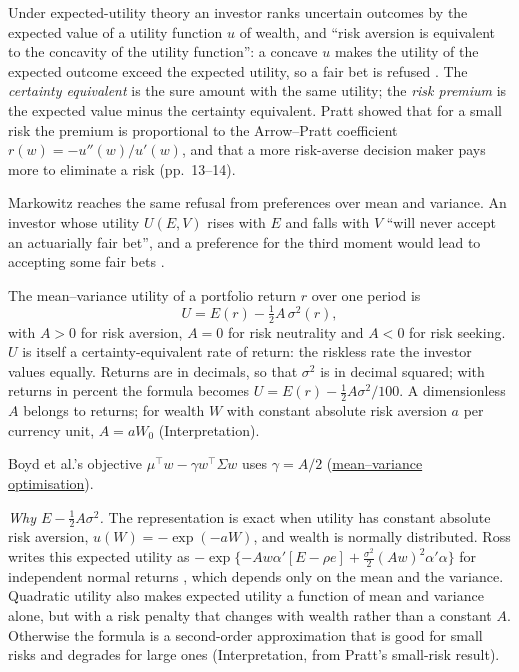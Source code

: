 \begin{qfdefinition}\label{def:risk-aversion-utility}
 Under expected-utility theory an investor ranks uncertain outcomes by the expected value of a utility function $u$ of wealth, and ``risk aversion is equivalent to the concavity of the utility function'': a concave $u$ makes the utility of the expected outcome exceed the expected utility, so a fair bet is refused \citep[IDEI working paper 804, July 2013, p.~3]{risk-choice-review-2013}. The \emph{certainty equivalent} is the sure amount with the same utility; the \emph{risk premium} is the expected value minus the certainty equivalent. Pratt showed that for a small risk the premium is proportional to the Arrow--Pratt coefficient $r(w)=-u''(w)/u'(w)$, and that a more risk-averse decision maker pays more to eliminate a risk (pp.~13--14).

Markowitz reaches the same refusal from preferences over mean and variance. An investor whose utility $U(E,V)$ rises with $E$ and falls with $V$ ``will never accept an actuarially fair bet'', and a preference for the third moment would lead to accepting some fair bets \citep[\emph{Journal of Finance} 7(1), 1952, pp.~90--91]{s6-markowitz}.

 The mean--variance utility of a portfolio return $r$ over one period is
\[ U=E(r)-\tfrac12A\,\sigma^2(r), \]
with $A>0$ for risk aversion, $A=0$ for risk neutrality and $A<0$ for risk seeking. $U$ is itself a certainty-equivalent rate of return: the riskless rate the investor values equally. Returns are in decimals, so that $\sigma^2$ is in decimal squared; with returns in percent the formula becomes $U=E(r)-\tfrac12A\sigma^2/100$. A dimensionless $A$ belongs to returns; for wealth $W$ with constant absolute risk aversion $a$ per currency unit, $A=aW_0$ (Interpretation).

Boyd et al.'s objective $\mu^\top w-\gamma w^\top\Sigma w$ uses $\gamma=A/2$ (\hyperref[mod:mean-variance-portfolio-optimisation]{mean--variance optimisation}).

 \emph{Why $E-\tfrac12A\sigma^2$.} The representation is exact when utility has constant absolute risk aversion, $u(W)=-\exp(-aW)$, and wealth is normally distributed. Ross writes this expected utility as $-\exp\{-Aw\alpha'[E-\rho e]+\tfrac{\sigma^2}{2}(Aw)^2\alpha'\alpha\}$ for independent normal returns \citep[\emph{Journal of Economic Theory} 13, 1976, sec.~I, eq.~(9), p.~344]{arbitrage-theory-1976}, which depends only on the mean and the variance. Quadratic utility also makes expected utility a function of mean and variance alone, but with a risk penalty that changes with wealth rather than a constant $A$. Otherwise the formula is a second-order approximation that is good for small risks and degrades for large ones (Interpretation, from Pratt's small-risk result).


\end{qfdefinition}
